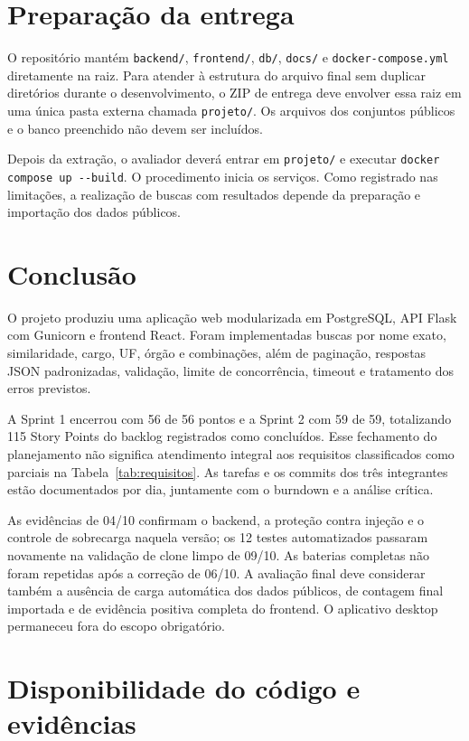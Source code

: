 \documentclass[12pt]{article}
\newcommand{\code}[1]{\texttt{#1}}
\begin{document}
\section{Preparação da entrega}

O repositório mantém \code{backend/}, \code{frontend/}, \code{db/},
\code{docs/} e \code{docker-compose.yml} diretamente na raiz. Para atender à
estrutura do arquivo final sem duplicar diretórios durante o desenvolvimento,
o ZIP de entrega deve envolver essa raiz em uma única pasta externa chamada
\code{projeto/}. Os arquivos dos conjuntos públicos e o banco preenchido não
devem ser incluídos.

Depois da extração, o avaliador deverá entrar em \code{projeto/} e executar
\code{docker compose up -{}-build}. O procedimento inicia os serviços. Como
registrado nas limitações, a realização de buscas com resultados depende da
preparação e importação dos dados públicos.

\section{Conclusão}

O projeto produziu uma aplicação web modularizada em PostgreSQL, API Flask com
Gunicorn e frontend React. Foram implementadas buscas por nome exato,
similaridade, cargo, UF, órgão e combinações, além de paginação, respostas JSON
padronizadas, validação, limite de concorrência, timeout e tratamento dos erros
previstos.

A Sprint 1 encerrou com 56 de 56 pontos e a Sprint 2 com 59 de 59, totalizando
115 Story Points do backlog registrados como concluídos. Esse fechamento do
planejamento não significa atendimento integral aos requisitos classificados
como parciais na Tabela~\ref{tab:requisitos}. As tarefas e os commits dos três
integrantes estão documentados por dia, juntamente com o burndown e a análise
crítica.

As evidências de 04/10 confirmam o backend, a proteção contra injeção e o
controle de sobrecarga naquela versão; os 12 testes automatizados passaram
novamente na validação de clone limpo de 09/10. As baterias completas não foram
repetidas após a correção de 06/10. A avaliação final deve considerar também a
ausência de carga automática dos dados públicos, de contagem final importada e
de evidência positiva completa do frontend. O aplicativo desktop permaneceu
fora do escopo obrigatório.

\section{Disponibilidade do código e evidências}
\end{document}
